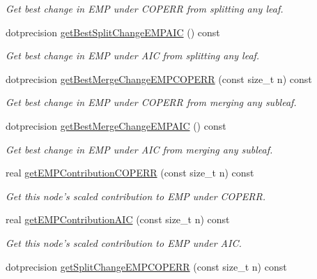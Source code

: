 \begin{DoxyCompactItemize}
\begin{DoxyCompactList}\small\item\em \-Get best change in \-E\-M\-P under \-C\-O\-P\-E\-R\-R from splitting any leaf. \end{DoxyCompactList}\item 
dotprecision \hyperlink{classsubpavings_1_1SPSnode_a53b9e7117d36f7730d458f26d74e0d28}{get\-Best\-Split\-Change\-E\-M\-P\-A\-I\-C} () const 
\begin{DoxyCompactList}\small\item\em \-Get best change in \-E\-M\-P under \-A\-I\-C from splitting any leaf. \end{DoxyCompactList}\item 
dotprecision \hyperlink{classsubpavings_1_1SPSnode_a7cf8fbd3c03d1edeedbd5a793c9b822d}{get\-Best\-Merge\-Change\-E\-M\-P\-C\-O\-P\-E\-R\-R} (const size\-\_\-t n) const 
\begin{DoxyCompactList}\small\item\em \-Get best change in \-E\-M\-P under \-C\-O\-P\-E\-R\-R from merging any subleaf. \end{DoxyCompactList}\item 
dotprecision \hyperlink{classsubpavings_1_1SPSnode_a0e8b9126a14255276600bf5293d33e24}{get\-Best\-Merge\-Change\-E\-M\-P\-A\-I\-C} () const 
\begin{DoxyCompactList}\small\item\em \-Get best change in \-E\-M\-P under \-A\-I\-C from merging any subleaf. \end{DoxyCompactList}\item 
real \hyperlink{classsubpavings_1_1SPSnode_a483f3b91707cda0deaee7a05d0523f3b}{get\-E\-M\-P\-Contribution\-C\-O\-P\-E\-R\-R} (const size\-\_\-t n) const 
\begin{DoxyCompactList}\small\item\em \-Get this node's scaled contribution to \-E\-M\-P under \-C\-O\-P\-E\-R\-R. \end{DoxyCompactList}\item 
real \hyperlink{classsubpavings_1_1SPSnode_aa939623d58172bc7f24ddf5dd249b5c2}{get\-E\-M\-P\-Contribution\-A\-I\-C} (const size\-\_\-t n) const 
\begin{DoxyCompactList}\small\item\em \-Get this node's scaled contribution to \-E\-M\-P under \-A\-I\-C. \end{DoxyCompactList}\item 
dotprecision \hyperlink{classsubpavings_1_1SPSnode_a33925f531930c000200f452209b0128c}{get\-Split\-Change\-E\-M\-P\-C\-O\-P\-E\-R\-R} (const size\-\_\-t n) const 

\end{DoxyCompactItemize}
